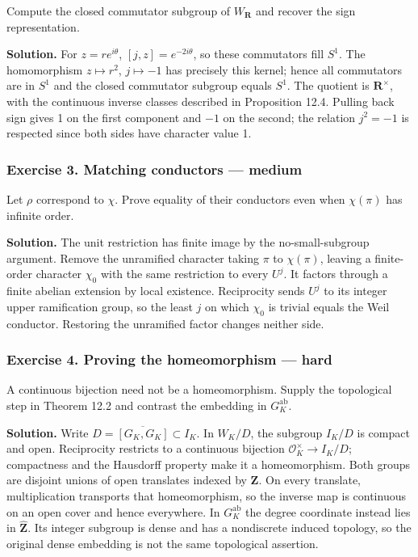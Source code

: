 \documentclass[11pt,a4paper]{article}
\begin{document}
Compute the closed commutator subgroup of \(W_{\mathbf R}\) and recover
the sign representation.

\textbf{Solution.} For \(z=re^{i\theta}\), \([j,z]=e^{-2i\theta}\), so
these commutators fill \(S^1\). The homomorphism \(z\mapsto r^2\),
\(j\mapsto-1\) has precisely this kernel; hence all commutators are in
\(S^1\) and the closed commutator subgroup equals \(S^1\). The quotient
is \(\mathbf R^\times\), with the continuous inverse classes described
in Proposition 12.4. Pulling back sign gives 1 on the first component
and \(-1\) on the second; the relation \(j^2=-1\) is respected since
both sides have character value 1.

\subsubsection{Exercise 3. Matching conductors ---
medium}\label{exercise-3.-matching-conductors-medium}

Let \(\rho\) correspond to \(\chi\). Prove equality of their conductors
even when \(\chi(\pi)\) has infinite order.

\textbf{Solution.} The unit restriction has finite image by the
no-small-subgroup argument. Remove the unramified character taking
\(\pi\) to \(\chi(\pi)\), leaving a finite-order character \(\chi_0\)
with the same restriction to every \(U^j\). It factors through a finite
abelian extension by local existence. Reciprocity sends \(U^j\) to its
integer upper ramification group, so the least \(j\) on which \(\chi_0\)
is trivial equals the Weil conductor. Restoring the unramified factor
changes neither side.

\subsubsection{Exercise 4. Proving the homeomorphism ---
hard}\label{exercise-4.-proving-the-homeomorphism-hard}

A continuous bijection need not be a homeomorphism. Supply the
topological step in Theorem 12.2 and contrast the embedding in
\(G_K^{\mathrm{ab}}\).

\textbf{Solution.} Write \(D=\overline{[G_K,G_K]}\subset I_K\). In
\(W_K/D\), the subgroup \(I_K/D\) is compact and open. Reciprocity
restricts to a continuous bijection \(\mathcal O_K^\times\to I_K/D\);
compactness and the Hausdorff property make it a homeomorphism. Both
groups are disjoint unions of open translates indexed by \(\mathbf Z\).
On every translate, multiplication transports that homeomorphism, so the
inverse map is continuous on an open cover and hence everywhere. In
\(G_K^{\mathrm{ab}}\) the degree coordinate instead lies in
\(\widehat{\mathbf Z}\). Its integer subgroup is dense and has a
nondiscrete induced topology, so the original dense embedding is not the
same topological assertion.
\end{document}
